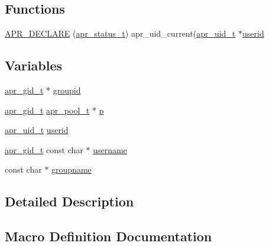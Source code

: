 \subsection*{Functions}
\begin{DoxyCompactItemize}
\item 
\hyperlink{group__apr__user_ga57b4c6adc3e9d22eeaeb32c8faafcc83}{A\+P\+R\+\_\+\+D\+E\+C\+L\+A\+RE} (\hyperlink{group__apr__errno_gaa5105fa83cc322f09382292db8b47593}{apr\+\_\+status\+\_\+t}) apr\+\_\+uid\+\_\+current(\hyperlink{group__apr__user_gad1aa508f584bc230acf4f68ba4fc4de7}{apr\+\_\+uid\+\_\+t} $\ast$\hyperlink{group__apr__user_ga8181c1a30a0f8b7ca638c03df3c11c2b}{userid}
\end{DoxyCompactItemize}
\subsection*{Variables}
\begin{DoxyCompactItemize}
\item 
\hyperlink{group__apr__user_ga22e9e224e984f837f3e276833e2f3a55}{apr\+\_\+gid\+\_\+t} $\ast$ \hyperlink{group__apr__user_gae8cd66e6b22e7060cc6804a872e29446}{groupid}
\item 
\hyperlink{group__apr__user_ga22e9e224e984f837f3e276833e2f3a55}{apr\+\_\+gid\+\_\+t} \hyperlink{structapr__pool__t}{apr\+\_\+pool\+\_\+t} $\ast$ \hyperlink{group__apr__user_ga2b87ce5c0cd5c5aa97fd3ba98460ab16}{p}
\item 
\hyperlink{group__apr__user_gad1aa508f584bc230acf4f68ba4fc4de7}{apr\+\_\+uid\+\_\+t} \hyperlink{group__apr__user_ga8181c1a30a0f8b7ca638c03df3c11c2b}{userid}
\item 
\hyperlink{group__apr__user_ga22e9e224e984f837f3e276833e2f3a55}{apr\+\_\+gid\+\_\+t} const char $\ast$ \hyperlink{group__apr__user_gaba2dfcdfda80edcb531a5a7115d3e043}{username}
\item 
const char $\ast$ \hyperlink{group__apr__user_ga401185bb13a6f4bfeccd15a40ff2efcd}{groupname}
\end{DoxyCompactItemize}


\subsection{Detailed Description}


\subsection{Macro Definition Documentation}

